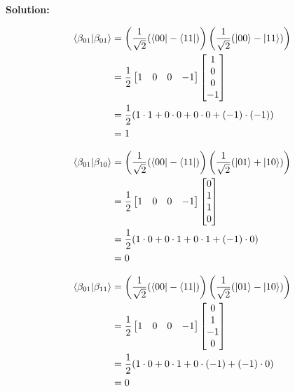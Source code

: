\documentclass[11pt]{article}
\newenvironment{solution}
{\par\noindent\textbf{Solution:}\par}
{\vspace{1em}}
\begin{document}
\begin{solution}
\[\begin{aligned}
\braket{\beta_{01}}{\beta_{01}} &= \left(\frac{1}{\sqrt{2}}(\bra{00} - \bra{11})\right) \left(\frac{1}{\sqrt{2}}(\ket{00} - \ket{11})\right) \\
&= \frac{1}{2} \begin{bmatrix}1&0&0&-1\end{bmatrix} \begin{bmatrix}1\\0\\0\\-1\end{bmatrix} \\
&= \frac{1}{2} (1 \cdot 1 + 0 \cdot 0 + 0 \cdot 0 + (-1) \cdot (-1)) \\
&= 1
\end{aligned}\]

\[\begin{aligned}
\braket{\beta_{01}}{\beta_{10}} &= \left(\frac{1}{\sqrt{2}}(\bra{00} - \bra{11})\right) \left(\frac{1}{\sqrt{2}}(\ket{01} + \ket{10})\right) \\
&= \frac{1}{2} \begin{bmatrix}1&0&0&-1\end{bmatrix} \begin{bmatrix}0\\1\\1\\0\end{bmatrix} \\
&= \frac{1}{2} (1 \cdot 0 + 0 \cdot 1 + 0 \cdot 1 + (-1) \cdot 0) \\
&= 0
\end{aligned}\]

\[\begin{aligned}
\braket{\beta_{01}}{\beta_{11}} &= \left(\frac{1}{\sqrt{2}}(\bra{00} - \bra{11})\right) \left(\frac{1}{\sqrt{2}}(\ket{01} - \ket{10})\right) \\
&= \frac{1}{2} \begin{bmatrix}1&0&0&-1\end{bmatrix} \begin{bmatrix}0\\1\\-1\\0\end{bmatrix} \\
&= \frac{1}{2} (1 \cdot 0 + 0 \cdot 1 + 0 \cdot (-1) + (-1) \cdot 0) \\
&= 0
\end{aligned}\]


\end{solution}
\end{document}
